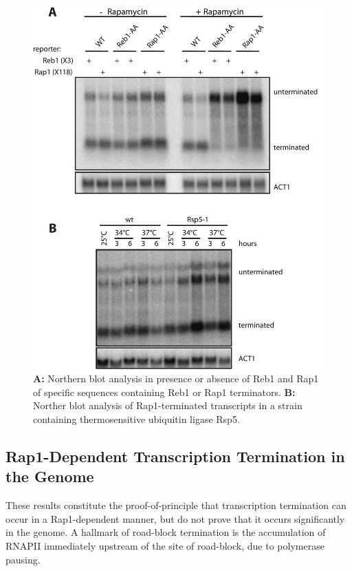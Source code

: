 \begin{figure}[hp!]

\centering
\includegraphics[width=\textwidth]{figures/results/rap/two.pdf}
\caption[dfgdf]{\textbf{A: }Northern blot analysis in presence or absence of Reb1 and Rap1 of specific sequences containing Reb1 or Rap1 terminators. \textbf{B: }Norther blot analysis of Rap1-terminated transcripts in a strain containing thermosensitive ubiquitin ligase Rsp5. }
\label{fig:two}

\end{figure}

\singlespacing
\subsection*{Rap1-Dependent Transcription Termination in the \cer{} Genome}
\doublespacing

These results constitute the proof-of-principle that transcription termination can occur in a Rap1-dependent manner, but do not prove that it occurs significantly in the \cer{} genome. A hallmark of road-block termination is the accumulation of RNAPII immediately upstream of the site of road-block, due to polymerase pausing. 


